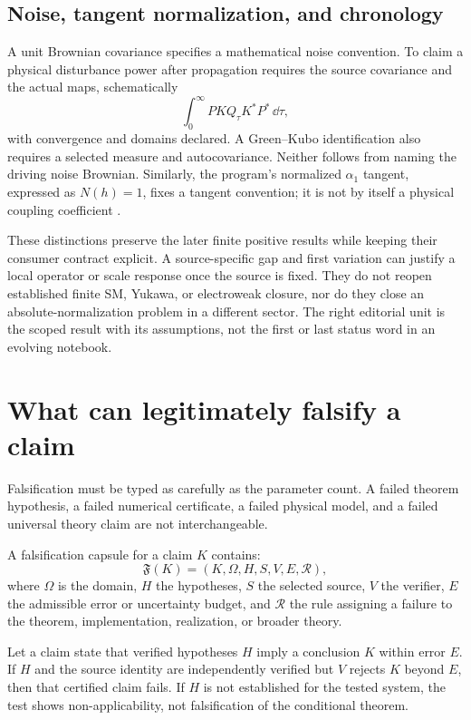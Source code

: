 \documentclass[11pt]{article}
\begin{document}
\subsection{Noise, tangent normalization, and chronology}
\label{sec:source-chronology}

A unit Brownian covariance specifies a mathematical noise convention. To
claim a physical disturbance power after propagation requires the source
covariance and the actual maps, schematically
\[
\int_0^\infty P K Q_\tau K^\ast P^\ast\,\dd\tau,
\]
with convergence and domains declared. A Green--Kubo identification also
requires a selected measure and autocovariance. Neither follows from naming
the driving noise Brownian. Similarly, the program's normalized
\(\alpha_1\) tangent, expressed as \(N(h)=1\), fixes a tangent convention;
it is not by itself a physical coupling coefficient \cite{FrozenNonSM}.

These distinctions preserve the later finite positive results while keeping
their consumer contract explicit. A source-specific gap and first variation
can justify a local operator or scale response once the source is fixed.
They do not reopen established finite SM, Yukawa, or electroweak closure, nor
do they close an absolute-normalization problem in a different sector. The
right editorial unit is the scoped result with its assumptions, not the
first or last status word in an evolving notebook.

\section{What can legitimately falsify a claim}

Falsification must be typed as carefully as the parameter count. A failed
theorem hypothesis, a failed numerical certificate, a failed physical model,
and a failed universal theory claim are not interchangeable.

\begin{definition}
\label{def:falsifier}
A falsification capsule for a claim \(K\) contains:
\[
\mathfrak F(K)=
(K,\Omega,H,S,V,E,\mathcal R),
\]
where \(\Omega\) is the domain, \(H\) the hypotheses, \(S\) the selected
source, \(V\) the verifier, \(E\) the admissible error or uncertainty budget,
and \(\mathcal R\) the rule assigning a failure to the theorem, implementation,
realization, or broader theory.
\end{definition}

\begin{proposition}
\label{prop:scope-rule}
Let a claim state that verified hypotheses \(H\) imply a conclusion \(K\)
within error \(E\). If \(H\) and the source identity are independently
verified but \(V\) rejects \(K\) beyond \(E\), then that certified claim fails.
If \(H\) is not established for the tested system, the test shows
non-applicability, not falsification of the conditional theorem.
\end{proposition}
\end{document}
